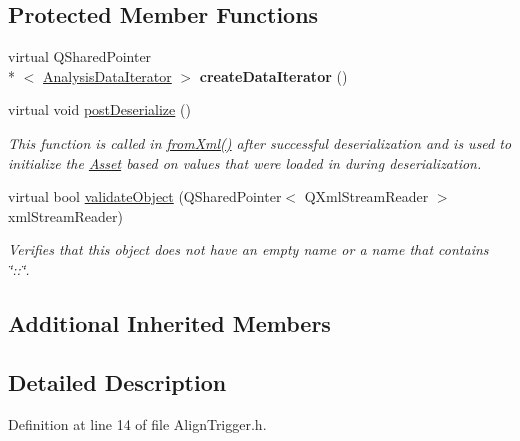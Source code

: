 \subsection*{Protected Member Functions}
\begin{DoxyCompactItemize}
\item 
\hypertarget{class_picto_1_1_align_trigger_a5077c179044f932c9d3e2acca765168d}{virtual Q\-Shared\-Pointer\\*
$<$ \hyperlink{class_picto_1_1_analysis_data_iterator}{Analysis\-Data\-Iterator} $>$ {\bfseries create\-Data\-Iterator} ()}\label{class_picto_1_1_align_trigger_a5077c179044f932c9d3e2acca765168d}

\item 
virtual void \hyperlink{class_picto_1_1_align_trigger_a3f40a9ee2655d48e49dc8a948ee84a6b}{post\-Deserialize} ()
\begin{DoxyCompactList}\small\item\em This function is called in \hyperlink{class_picto_1_1_asset_a8bed4da09ecb1c07ce0dab313a9aba67}{from\-Xml()} after successful deserialization and is used to initialize the \hyperlink{class_picto_1_1_asset}{Asset} based on values that were loaded in during deserialization. \end{DoxyCompactList}\item 
\hypertarget{class_picto_1_1_align_trigger_a22686abca1d448cf9e31bb72cdf69bd5}{virtual bool \hyperlink{class_picto_1_1_align_trigger_a22686abca1d448cf9e31bb72cdf69bd5}{validate\-Object} (Q\-Shared\-Pointer$<$ Q\-Xml\-Stream\-Reader $>$ xml\-Stream\-Reader)}\label{class_picto_1_1_align_trigger_a22686abca1d448cf9e31bb72cdf69bd5}

\begin{DoxyCompactList}\small\item\em Verifies that this object does not have an empty name or a name that contains \char`\"{}\-::\char`\"{}. \end{DoxyCompactList}\end{DoxyCompactItemize}
\subsection*{Additional Inherited Members}


\subsection{Detailed Description}


Definition at line 14 of file Align\-Trigger.\-h.



